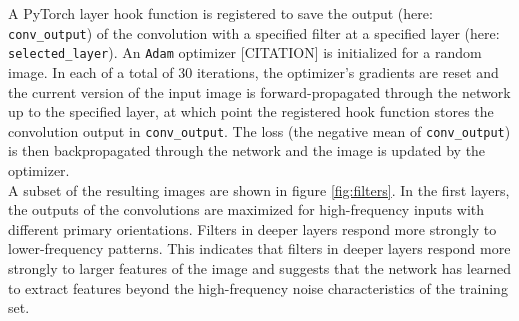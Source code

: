 \documentclass[a4paper]{article}
\begin{document}
A PyTorch layer hook function is registered to save the output (here: \texttt{conv\_output}) of the convolution with a specified filter at a specified layer (here: \texttt{selected\_layer}). An \texttt{Adam} optimizer [CITATION] is initialized for a random image. In each of a total of 30 iterations, the optimizer's gradients are reset and the current version of the input image is forward-propagated through the network up to the specified layer, at which point the registered hook function stores the convolution output in \texttt{conv\_output}. The loss (the negative mean of \texttt{conv\_output}) is then backpropagated through the network and the image is updated by the optimizer.\\
A subset of the resulting images are shown in figure \ref{fig:filters}. In the first layers, the outputs of the convolutions are maximized for high-frequency inputs with different primary orientations. Filters in deeper layers respond more strongly to lower-frequency patterns. This indicates that filters in deeper layers respond more strongly to larger features of the image and suggests that the network has learned to extract features beyond the high-frequency noise characteristics of the training set.
\end{document}
